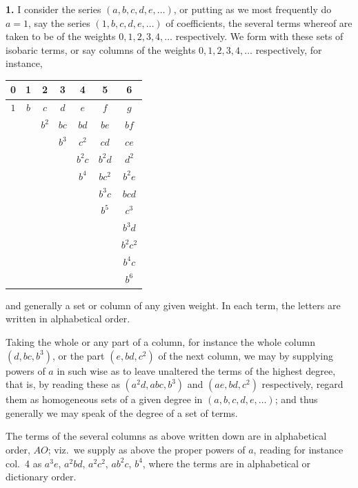 \documentclass[11pt]{article}
\begin{document}
\textbf{1.} I consider the series $(a, b, c, d, e, \ldots)$, or putting as we most frequently do $a = 1$, say the series $(1, b, c, d, e, \ldots)$ of coefficients, the several terms whereof are taken to be of the weights $0, 1, 2, 3, 4, \ldots$ respectively. We form with these sets of isobaric terms, or say columns of the weights $0, 1, 2, 3, 4, \ldots$ respectively, for instance,
\begin{center}
\begin{tabular}{ccccccc}
0 & 1 & 2 & 3 & 4 & 5 & 6 \\
\hline
$1$ & $b$ & $c$ & $d$ & $e$ & $f$ & $g$ \\
  &   & $b^2$ & $bc$ & $bd$ & $be$ & $bf$ \\
  &   &   & $b^3$ & $c^2$ & $cd$ & $ce$ \\
  &   &   &   & $b^2 c$ & $b^2 d$ & $d^2$ \\
  &   &   &   & $b^4$ & $bc^2$ & $b^2 e$ \\
  &   &   &   &   & $b^3 c$ & $bcd$ \\
  &   &   &   &   & $b^5$ & $c^3$ \\
  &   &   &   &   &   & $b^3 d$ \\
  &   &   &   &   &   & $b^2 c^2$ \\
  &   &   &   &   &   & $b^4 c$ \\
  &   &   &   &   &   & $b^6$ \\
\end{tabular}
\end{center}

and generally a set or column of any given weight. In each term, the letters are written in alphabetical order.

Taking the whole or any part of a column, for instance the whole column $(d, bc, b^3)$, or the part $(e, bd, c^2)$ of the next column, we may by supplying powers of $a$ in such wise as to leave unaltered the terms of the highest degree, that is, by reading these as $(a^2 d, abc, b^3)$ and $(ae, bd, c^2)$ respectively, regard them as homogeneous sets of a given degree in $(a, b, c, d, e, \ldots)$; and thus generally we may speak of the degree of a set of terms.

The terms of the several columns as above written down are in alphabetical order, $AO$; viz.\ we supply as above the proper powers of $a$, reading for instance col.\ 4 as $a^3 e$, $a^2 bd$, $a^2 c^2$, $ab^2 c$, $b^4$, where the terms are in alphabetical or dictionary order.
\end{document}
